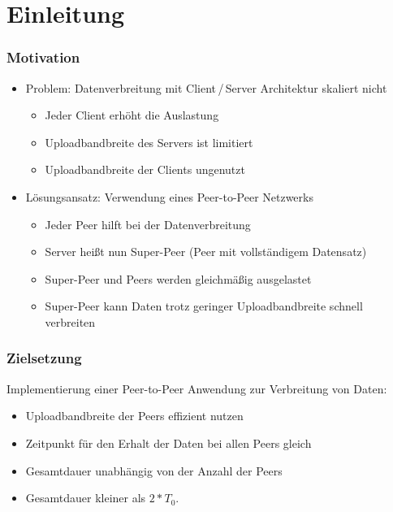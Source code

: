 \section{Einleitung}

\begin{frame}
  \frametitle{Motivation}  
  \begin{itemize}
    \item Problem: Datenverbreitung mit Client\,/\,Server Architektur skaliert nicht
    \vspace{1mm}
    \begin{itemize}
      \item Jeder Client erhöht die Auslastung
      \vspace{1mm}
      \item Uploadbandbreite des Servers ist limitiert        
      \vspace{1mm}
      \item Uploadbandbreite der Clients ungenutzt
    \end{itemize}

    \vspace{2mm}

    \item Lösungsansatz: Verwendung eines Peer-to-Peer Netzwerks
    \vspace{1mm}
    \begin{itemize}
      \item Jeder Peer hilft bei der Datenverbreitung
      \vspace{1mm}
      \item Server heißt nun Super-Peer (Peer mit vollständigem Datensatz)
      \vspace{1mm}
      \item Super-Peer und Peers werden gleichmäßig ausgelastet
      \vspace{1mm}
      \item Super-Peer kann Daten trotz geringer Uploadbandbreite schnell verbreiten
    \end{itemize}    
  \end{itemize}
\end{frame}


\begin{frame}
  \frametitle{Zielsetzung}
    Implementierung einer Peer-to-Peer Anwendung zur Verbreitung von Daten:
    \vspace{1mm}
    \begin{itemize}
      \item Uploadbandbreite der Peers effizient nutzen
      \item Zeitpunkt für den Erhalt der Daten bei allen Peers gleich
      \item Gesamtdauer unabhängig von der Anzahl der Peers
      \item Gesamtdauer kleiner als $2 * T_0$.
    \end{itemize}
\end{frame}